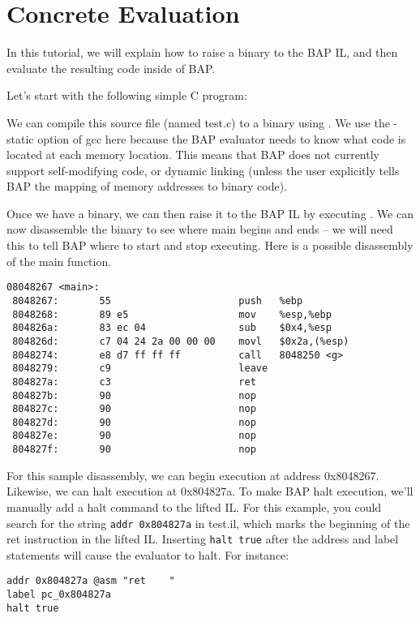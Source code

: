\section{Concrete Evaluation}

In this tutorial, we will explain how to raise a binary to the BAP IL,
and then evaluate the resulting code inside of BAP.

Let's start with the following simple C program:


We can compile this source file (named test.c) to a binary using
.  We use the -static option of
gcc here because the BAP evaluator needs to know what code is located
at each memory location. This means that BAP does not currently
support self-modifying code, or dynamic linking (unless the user
explicitly tells BAP the mapping of memory addresses to binary code).

Once we have a binary, we can then raise it to the BAP IL by executing
. We can now disassemble the binary
to see where main begins and ends -- we will need this to tell BAP
where to start and stop executing. Here is a possible disassembly of
the main function.

\begin{verbatim}
08048267 <main>:
 8048267:       55                      push   %ebp
 8048268:       89 e5                   mov    %esp,%ebp
 804826a:       83 ec 04                sub    $0x4,%esp
 804826d:       c7 04 24 2a 00 00 00    movl   $0x2a,(%esp)
 8048274:       e8 d7 ff ff ff          call   8048250 <g>
 8048279:       c9                      leave  
 804827a:       c3                      ret    
 804827b:       90                      nop
 804827c:       90                      nop
 804827d:       90                      nop
 804827e:       90                      nop
 804827f:       90                      nop
\end{verbatim}

For this sample disassembly, we can begin execution at address
0x8048267.  Likewise, we can halt execution at 0x804827a.  To make BAP
halt execution, we'll manually add a halt command to the lifted IL.
For this example, you could search for the string
\verb!addr 0x804827a! in test.il, which marks the beginning of the ret
instruction in the lifted IL.  Inserting \verb!halt true!  after the
address and label statements will cause the evaluator to halt.  For
instance:

\begin{verbatim}
addr 0x804827a @asm "ret    "
label pc_0x804827a
halt true
\end{verbatim}

